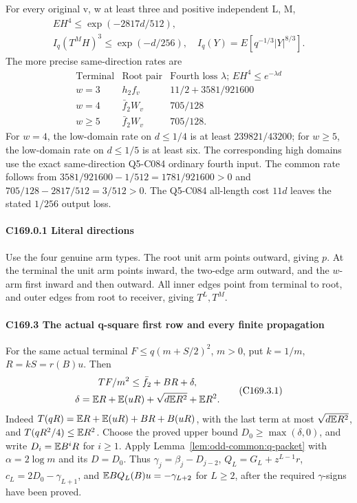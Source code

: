 For every original v, w at least three and positive independent L, M,
\[
\boxed{\begin{gathered}
EH^4\le\exp(-2817d/512),\qquad\\
I_q(T^M H)^3\le\exp(-d/256),\quad I_q(Y)=E[q^{-1/3}|Y|^{8/3}].
\end{gathered}}\tag{C169.0.2}
\]
The more precise same-direction rates are
\[
\begin{array}{c|c|c}
\text{Terminal}&\text{Root pair}&\text{Fourth loss }\lambda\text{; }EH^4\le e^{-\lambda d}\\\hline
w=3&h_2f_v&11/2+3581/921600\\
w=4&\bar f_2W_v&705/128\\
w\ge5&\bar f_2W_v&705/128.
\end{array}                                                        \tag{C169.0.3}
\]
For \(w=4\), the low-domain rate on \(d\le1/4\) is at least \(239821/43200\); for \(w\ge5\), the low-domain rate on \(d\le1/5\) is at least six. The corresponding high domains use the exact same-direction Q5-C084 ordinary fourth input. The common rate follows from \(3581/921600-1/512=1781/921600>0\) and \(705/128-2817/512=3/512>0\). The Q5-C084 all-length cost \(11d\) leaves the stated \(1/256\) output loss.

\paragraph{C169.0.1 Literal directions}

Use the four genuine arm types. The root unit arm points outward, giving \(p\). At the terminal the unit arm points inward, the two-edge arm outward, and the \(w\)-arm first inward and then outward. All inner edges point from terminal to root, and outer edges from root to receiver, giving \(T^L,\allowbreak \allowbreak  T^M\).


\paragraph{C169.3 The actual q-square first row and every finite propagation}

For the same actual terminal \(F\le q(m+S/2)^2\), \(m>0\), put
\(k=1/m\), \(R=kS=r(B)u\). Then
\[
 \begin{gathered}
 TF/m^2\le\bar f_2+BR+\delta,\\
 \delta=\mathbb E R+\mathbb E(uR)+\sqrt{d\mathbb E R^2}+\mathbb E R^2.
 \end{gathered}\tag{C169.3.1}
\]
Indeed \(T(qR)=\mathbb E R+\mathbb E(uR)+BR+B(uR)\), with the last term
at most \(\sqrt{d\mathbb E R^2}\), and \(T(qR^2/4)\le\mathbb E R^2\).
Choose the proved upper bound \(D_0\ge\max(\delta,0)\), and write
\(D_i=\mathbb E B^iR\) for \(i\ge1\).
Apply Lemma~\ref{lem:odd-common:q-packet} with
\(\alpha=2\log m\) and its \(D=D_0\).
Thus \(\gamma_j=\beta_j-D_{j-2}\),
\(Q_L=G_L+z^{L-1}r\), \(c_L=2D_0-\gamma_{L+1}\),
and \(\mathbb E BQ_L(B)u=-\gamma_{L+2}\) for \(L\ge2\), after the
required \(\gamma\)-signs have been proved.

